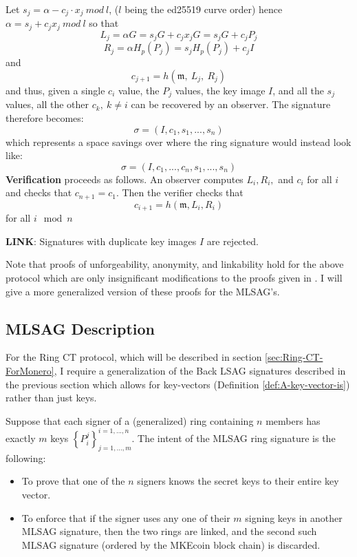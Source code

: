 \documentclass[12pt,oneside,english]{amsart}
\numberwithin{equation}{section}
\numberwithin{figure}{section}
\theoremstyle{plain}
\theoremstyle{plain}
\theoremstyle{remark}
\theoremstyle{plain}
\theoremstyle{remark}
\theoremstyle{remark}
\theoremstyle{plain}
\theoremstyle{definition}
\begin{document}
Let $s_{j}=\alpha-c_{j}\cdot x_j\ mod\ l$, ($l$ being the ed25519
curve order) hence $\alpha=s_{j}+c_{j}x_j\ mod\ l$ so that 
\[
L_{j}=\alpha G=s_{j}G+c_{j}x_jG=s_{j}G+c_{j}P_{j}
\]
\[
R_{j}=\alpha 
H_p\left(P_{j}\right)=s_{j}H_p\left(P_{j}\right)+c_{j}I
\]
and 
\[
c_{j+1}=h\left(\mathfrak{m},\ L_{j},\ R_{j}\right)
\]
 and thus, given a single $c_{i}$ value, the $P_{j}$ values, the
key image $I$, and all the $s_{j}$ values, all the other $c_{k},\ k\neq i$
can be recovered by an observer. The signature therefore becomes:
\[
\sigma=\left(I,c_{1},s_{1},...,s_{n}\right)
\]
 which represents a space savings over \cite[4.4]{CN} where the ring signature would instead look like: 
 \[
\sigma=\left(I,c_{1}, ..., c_{n},s_{1},...,s_{n}\right)
\]
\textbf{Verification }proceeds as follows. An observer computes $L_{i},R_{i},$
and $c_{i}$ for all $i$ and checks that $c_{n+1}=c_{1}$. Then the
verifier checks that 
\[
c_{i+1}=h\left(\mathfrak{m},L_{i},R_{i}\right)
\]
 for all $i\mod n$ 

\textbf{LINK}: Signatures with duplicate key images $I$ are rejected. 

Note that proofs of unforgeability, anonymity, and linkability
hold for the above protocol which are only insignificant modifications to the proofs
given in \cite{LWW}. I will give a more generalized version of these
proofs for the MLSAG's. 
\subsection{\label{sub:MLSAG-Description}MLSAG Description}


For the Ring CT protocol, which will be described in section
\ref{sec:Ring-CT-ForMonero}, I require a generalization of the Back
LSAG signatures described in the previous section which allows for key-vectors (Definition
\ref{def:A-key-vector-is}) rather than just keys. 


Suppose that each signer of a (generalized) ring containing $n$
members has exactly $m$ keys $\left\{ P_{i}^{j}\right\} _{j=1,...,m}^{i=1,...,n}$.
The intent of the MLSAG ring signature is the following: 
\begin{itemize}
\item To prove that one of the $n$ signers knows the secret keys to their entire key vector. 
\item To enforce that if the signer uses any one of their $m$ signing keys in another MLSAG
signature, then the two rings are linked, and the second such MLSAG signature (ordered by the MKEcoin block chain) is discarded. 
\end{itemize}
\end{document}
